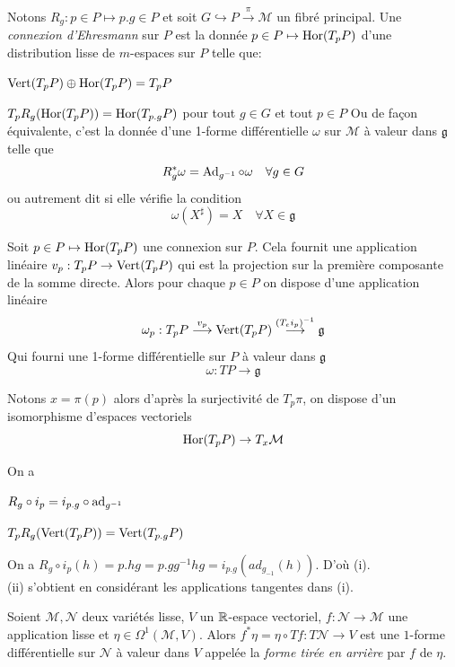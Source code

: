 \documentclass[12pt, a4paper]{book}
\begin{document}
\begin{defi}
Notons $R_g : p\in P \mapsto p.g \in P$ et soit $G \hookrightarrow P \overset{\pi}{\to} \mathcal{M}$ un fibré principal. Une \emph{connexion d'Ehresmann} sur $P$ est la donnée $p\in P \mapsto \operatorname{Hor}(T_pP)$ d'une distribution lisse de $m$-espaces sur $P$ telle que:
\be
	\item $\operatorname{Vert}(T_pP) \oplus \operatorname{Hor}(T_pP) = T_pP$
	\item $T_pR_g(\operatorname{Hor}(T_pP)) = \operatorname{Hor}(T_{p.g}P)$ pour tout $g\in G$ et tout $p\in P$
\ee 
Ou de façon équivalente, c'est la donnée d'une 1-forme différentielle $\omega$ sur $\mathcal{M}$ à valeur dans $\mathfrak{g}$ telle que
$$R_g^*\omega  = \operatorname{Ad}_{g^{-1}} \circ \omega \quad \forall g\in G$$
ou autrement dit si elle vérifie la condition 
$$\omega(X^\sharp) = X \quad \forall X \in \mathfrak{g}$$
\end{defi}
\begin{preu}
Soit $p \in P \mapsto \operatorname{Hor}(T_pP)$ une connexion sur $P$. Cela fournit une application linéaire $v_p : T_pP \to \operatorname{Vert}(T_pP)$ qui est la projection sur la première composante de la somme directe. Alors pour chaque $p\in P$ on dispose d'une application linéaire 
$$\omega_p : T_pP \overset{v_p}{\longrightarrow} \operatorname{Vert}(T_pP) \overset{(T_e i_p)^{-1}}{\longrightarrow} \mathfrak{g}$$
Qui fourni une 1-forme différentielle sur $P$ à valeur dans $\mathfrak{g}$
$$\omega : TP \to \mathfrak{g}$$
\end{preu}

\begin{pro}
Notons $x = \pi(p)$ alors d'après la surjectivité de $T_p\pi$, on dispose d'un isomorphisme d'espaces vectoriels
$$\operatorname{Hor}(T_pP) \to T_x\mathcal{M}$$
\end{pro}

\begin{pro}
On a 
\be
	\item $R_g \circ i_p = i_{p.g} \circ \operatorname{ad}_{g^{-1}}$
	\item $T_pR_g(\operatorname{Vert}(T_pP)) = \operatorname{Vert}(T_{p.g}P)$
\ee
\end{pro}
\begin{preu}
On a $R_g \circ i_p(h) = p.hg = p.gg^{-1}hg = i_{p.g}(ad_{g_{-1}}(h))$. D'où (i).\\
(ii) s'obtient en considérant les applications tangentes dans (i).
\end{preu}

\begin{defi}
Soient $\mathcal{M}, \mathcal{N}$ deux variétés lisse, $V$ un $\mathbb{R}$-espace vectoriel, $f:\mathcal{N} \to \mathcal{M}$ une application lisse et $\eta \in \Omega^1(\mathcal{M}, V)$. Alors $f^*\eta = \eta \circ Tf : T\mathcal{N} \to V$ est une $1$-forme différentielle sur $\mathcal{N}$ à valeur dans $V$ appelée la \emph{forme tirée en arrière} par $f$ de $\eta$. \\
\end{defi}
\end{document}

